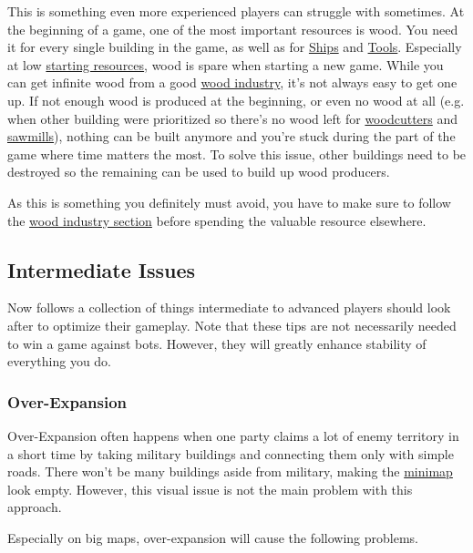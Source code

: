 \documentclass[12pt]{article}
\begin{document}
This is something even more experienced players can struggle with sometimes. At the beginning of a game, one of the most important resources is wood. You need it for every single building in the game, as well as for \hyperref[sec:ships]{Ships} and \hyperref[sec:metalworks]{Tools}. Especially at low \hyperref[sec:startingresources]{starting resources}, wood is spare when starting a new game. While you can get infinite wood from a good \hyperref[sec:woodindustry]{wood industry}, it's not always easy to get one up. If not enough wood is produced at the beginning, or even no wood at all (e.g. when other building were prioritized so there's no wood left for \hyperref[sec:woodcutter]{woodcutters} and \hyperref[sec:sawmill]{sawmills}), nothing can be built anymore and you're stuck during the part of the game where time matters the most. To solve this issue, other buildings need to be destroyed so the remaining can be used to build up wood producers.

As this is something you definitely must avoid, you have to make sure to follow the \hyperref[sec:woodindustry]{wood industry section} before spending the valuable resource elsewhere.

\subsection{Intermediate Issues}
\label{sec:intermediateissues}

Now follows a collection of things intermediate to advanced players should look after to optimize their gameplay. Note that these tips are not necessarily needed to win a game against bots. However, they will greatly enhance stability of everything you do.

\subsubsection{Over-Expansion}
\label{sec:overexpansion}

Over-Expansion often happens when one party claims a lot of enemy territory in a short time by taking military buildings and connecting them only with simple roads. There won't be many buildings aside from military, making the \hyperref[sec:minimap]{minimap} look empty. However, this visual issue is not the main problem with this approach.

Especially on big maps, over-expansion will cause the following problems.
\end{document}
